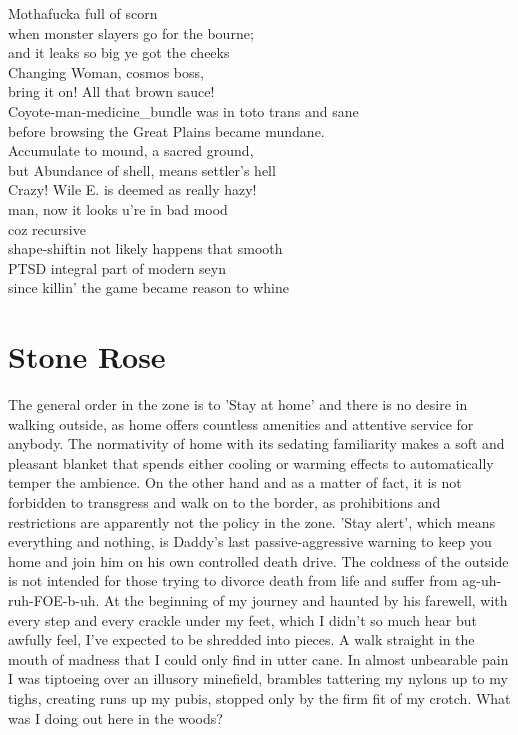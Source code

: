 \documentclass{article}
\begin{document}
Mothafucka full of scorn \\
when monster slayers go for the bourne; \\
and it leaks so big ye got the cheeks \\
Changing Woman, cosmos boss, \\ 
bring it on! All that brown sauce! \\

Coyote-man-medicine\_bundle was in toto trans and sane \\
before browsing the Great Plains became mundane. \\
Accumulate to mound, a sacred ground, \\ 
but Abundance of shell, means settler's hell \\
Crazy! Wile E. is deemed as really hazy! \\

man, now it looks u're in bad mood \\
coz recursive \\ 
shape-shiftin not likely happens that smooth \\
PTSD integral part of modern seyn \\
since killin' the game became reason to whine  \\

\section*{Stone Rose}
The general order in the zone is to 'Stay at home'
and there is no desire in walking outside,
as home offers countless amenities and attentive service
for anybody.
The normativity of home with its sedating familiarity
makes a soft and pleasant blanket that 
spends either cooling or warming effects to 
automatically temper the ambience.
On the other hand and as a matter of fact, 
it is not forbidden to transgress and walk on to the border,
as prohibitions and restrictions are apparently not the policy in the zone.
'Stay alert', which means everything and  nothing, is Daddy's last passive-aggressive
warning to keep you home and join him on his own controlled death drive.
The coldness of the outside is not intended for those
trying to divorce death from life
and suffer from ag-uh-ruh-FOE-b-uh. At the beginning of my journey and haunted by his farewell,
with every step and every crackle under my feet, 
which I didn't so much hear but awfully feel, 
I've expected to be shredded into pieces.
A walk straight in the mouth of madness 
that I could only find in utter cane.
In almost unbearable pain I was tiptoeing 
over an illusory minefield, 
brambles tattering my nylons
up to my tighs, creating runs up my pubis,
stopped only by the firm fit of my crotch.
What was I doing out here in the woods?
\end{document}
